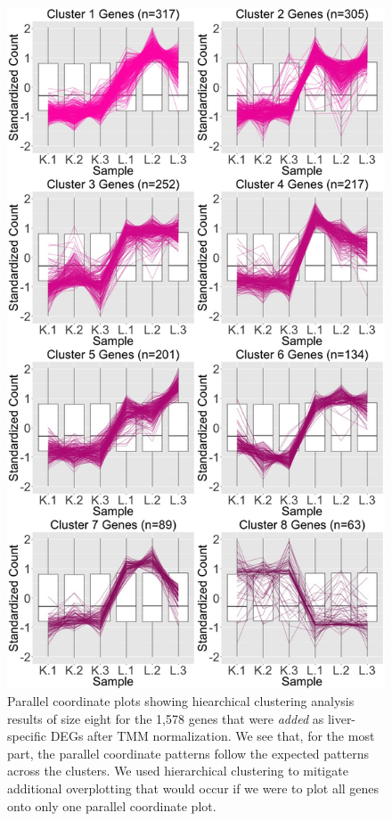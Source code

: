 \documentclass{article}
\begin{document}
\null
\begin{figure}[t!]
\centerline{\includegraphics[width=0.65\columnwidth]{../MakeFigures/lkClustersAdd.jpg}}
\caption{Parallel coordinate plots showing hiearchical clustering analysis results of size eight for the 1,578 genes that were \textit{added} as liver-specific DEGs after TMM normalization. We see that, for the most part, the parallel coordinate patterns follow the expected patterns across the clusters. We used hierarchical clustering to mitigate additional overplotting that would occur if we were to plot all genes onto only one parallel coordinate plot.
\label{lkClustersAdd}}
\end{figure}
\end{document}
